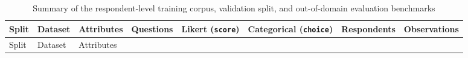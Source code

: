 \documentclass[
  letterpaper,
  DIV=11,
  numbers=noendperiod]{scrartcl}
\begin{document}
\begin{longtable}[]{@{}
  >{\raggedright\arraybackslash}p{}
  >{\raggedright\arraybackslash}p{}
  >{\raggedleft\arraybackslash}p{}
  >{\raggedleft\arraybackslash}p{}
  >{\raggedleft\arraybackslash}p{}
  >{\raggedleft\arraybackslash}p{}
  >{\raggedleft\arraybackslash}p{}
  >{\raggedleft\arraybackslash}p{}@{}}
\caption{Summary of the respondent-level training corpus, validation
split, and out-of-domain evaluation
benchmarks}\label{tbl-datasets}\tabularnewline
\toprule\noalign{}
\begin{minipage}[b]{\linewidth}\raggedright
Split
\end{minipage} & \begin{minipage}[b]{\linewidth}\raggedright
Dataset
\end{minipage} & \begin{minipage}[b]{\linewidth}\raggedleft
Attributes
\end{minipage} & \begin{minipage}[b]{\linewidth}\raggedleft
Questions
\end{minipage} & \begin{minipage}[b]{\linewidth}\raggedleft
Likert (\texttt{score})
\end{minipage} & \begin{minipage}[b]{\linewidth}\raggedleft
Categorical (\texttt{choice})
\end{minipage} & \begin{minipage}[b]{\linewidth}\raggedleft
Respondents
\end{minipage} & \begin{minipage}[b]{\linewidth}\raggedleft
Observations
\end{minipage} \\
\midrule\noalign{}
\endfirsthead
\toprule\noalign{}
\begin{minipage}[b]{\linewidth}\raggedright
Split
\end{minipage} & \begin{minipage}[b]{\linewidth}\raggedright
Dataset
\end{minipage} & \begin{minipage}[b]{\linewidth}\raggedleft
Attributes
\end{minipage} & \begin{minipage}[b]{\linewidth}\raggedleft

\end{minipage}
\end{longtable}
\end{document}
